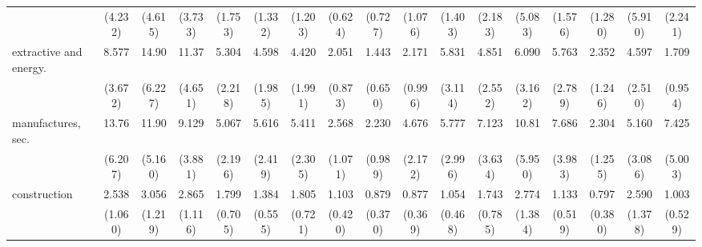 {\begin{tabular}{l*{16}{c}}
                    &     (4.232)         &     (4.615)         &     (3.733)         &     (1.753)         &     (1.332)         &     (1.203)         &     (0.624)         &     (0.727)         &     (1.076)         &     (1.403)         &     (2.183)         &     (5.083)         &     (1.576)         &     (1.280)         &     (5.910)         &     (2.241)         \\
[1em]
extractive and energy.&       8.577\sym{***}&       14.90\sym{***}&       11.37\sym{***}&       5.304\sym{***}&       4.598\sym{***}&       4.420\sym{***}&       2.051         &       1.443         &       2.171         &       5.831\sym{***}&       4.851\sym{**} &       6.090\sym{***}&       5.763\sym{***}&       2.352         &       4.597\sym{**} &       1.709         \\
                    &     (3.672)         &     (6.227)         &     (4.651)         &     (2.218)         &     (1.985)         &     (1.991)         &     (0.873)         &     (0.650)         &     (0.996)         &     (3.114)         &     (2.552)         &     (3.162)         &     (2.789)         &     (1.246)         &     (2.510)         &     (0.954)         \\
[1em]
manufactures, sec.  &       13.76\sym{***}&       11.90\sym{***}&       9.129\sym{***}&       5.067\sym{***}&       5.616\sym{***}&       5.411\sym{***}&       2.568\sym{*}  &       2.230         &       4.676\sym{***}&       5.777\sym{***}&       7.123\sym{***}&       10.81\sym{***}&       7.686\sym{***}&       2.304         &       5.160\sym{**} &       7.425\sym{**} \\
                    &     (6.207)         &     (5.160)         &     (3.881)         &     (2.196)         &     (2.419)         &     (2.305)         &     (1.071)         &     (0.989)         &     (2.172)         &     (2.996)         &     (3.634)         &     (5.950)         &     (3.983)         &     (1.255)         &     (3.086)         &     (5.003)         \\
[1em]
construction        &       2.538\sym{*}  &       3.056\sym{**} &       2.865\sym{**} &       1.799         &       1.384         &       1.805         &       1.103         &       0.879         &       0.877         &       1.054         &       1.743         &       2.774\sym{*}  &       1.133         &       0.797         &       2.590         &       1.003         \\
                    &     (1.060)         &     (1.219)         &     (1.116)         &     (0.705)         &     (0.555)         &     (0.721)         &     (0.420)         &     (0.370)         &     (0.369)         &     (0.468)         &     (0.785)         &     (1.384)         &     (0.519)         &     (0.380)         &     (1.378)         &     (0.529)         \\

\end{tabular}}
